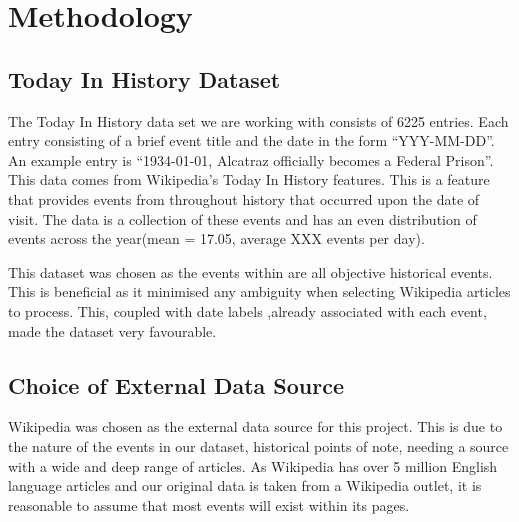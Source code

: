 \documentclass[bsc,frontabs,twoside,singlespacing,parskip,deptreport]{infthesis}     %
\begin{document}
\chapter{Methodology}


\section{Today In History Dataset}
The Today In History data set we are working with consists of 6225 entries. Each entry consisting
of a  brief event title and the date in the form ``YYY-MM-DD''.
An example entry is ``1934-01-01, Alcatraz officially becomes a Federal Prison''.
This data comes from Wikipedia's Today In History features. This is a feature that provides events from
throughout history that occurred upon the date of visit. The data is a collection of these events and has
an even distribution of events across the year(mean =  17.05, average XXX events per day).


This dataset was chosen as the events within are all objective historical events. This is beneficial as it minimised
any ambiguity when selecting Wikipedia articles to process. This, coupled with date labels ,already associated with
each event, made the dataset very favourable.


\section{Choice of External Data Source}
Wikipedia was chosen as the external data source for this project.
This is due to the nature of the events in our dataset, historical points of note,
needing a source with a wide and deep range of articles.
As Wikipedia has over 5 million English language articles \cite{wikipedaisize} and our original data
is taken from a Wikipedia outlet, it is reasonable to assume
that most events will exist within its pages.
\end{document}
